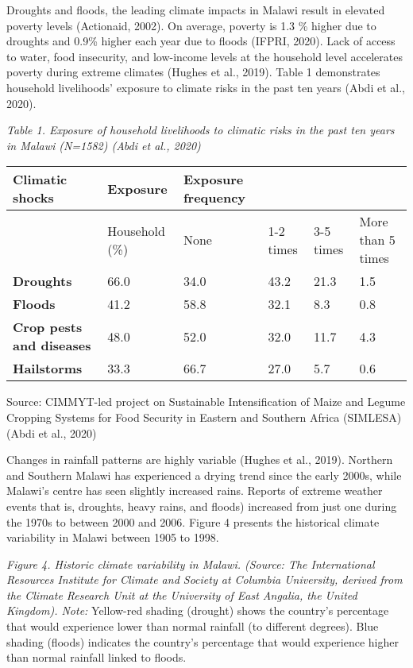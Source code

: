 \documentclass[
]{book}
\begin{document}
Droughts and floods, the leading climate impacts in Malawi result in elevated poverty levels (Actionaid, 2002). On average, poverty is 1.3 \% higher due to
droughts and 0.9\% higher each year due to floods (IFPRI, 2020). Lack of access to water, food insecurity, and low-income levels at the household level
accelerates poverty during extreme climates (Hughes et al., 2019). Table 1 demonstrates household livelihoods' exposure to climate risks in the past ten years
(Abdi et al., 2020).

\emph{Table 1. Exposure of household livelihoods to climatic risks in the past ten years in Malawi (N=1582) (Abdi et al., 2020)}

\begin{longtable}[]{@{}llllll@{}}
\toprule
\textbf{Climatic shocks} & \textbf{Exposure} & \textbf{Exposure frequency} & & & \\
\midrule
\endhead
& Household (\%) & None & 1-2 times & 3-5 times & More than 5 times \\
\textbf{Droughts} & 66.0 & 34.0 & 43.2 & 21.3 & 1.5 \\
\textbf{Floods} & 41.2 & 58.8 & 32.1 & 8.3 & 0.8 \\
\textbf{Crop pests and diseases} & 48.0 & 52.0 & 32.0 & 11.7 & 4.3 \\
\textbf{Hailstorms} & 33.3 & 66.7 & 27.0 & 5.7 & 0.6 \\
\bottomrule
\end{longtable}

Source: CIMMYT-led project on Sustainable Intensification of Maize and Legume Cropping Systems for Food Security in Eastern and Southern Africa (SIMLESA) (Abdi
et al., 2020)

Changes in rainfall patterns are highly variable (Hughes et al., 2019). Northern and Southern Malawi has experienced a drying trend since the early 2000s, while
Malawi's centre has seen slightly increased rains. Reports of extreme weather events that is, droughts, heavy rains, and floods) increased from just one during
the 1970s to between 2000 and 2006. Figure 4 presents the historical climate variability in Malawi between 1905 to 1998.

\emph{Figure 4. Historic climate variability in Malawi. (Source: The International Resources Institute for Climate and Society at Columbia University, derived from the Climate Research Unit at the University of East Angalia, the United Kingdom). Note:} Yellow-red shading (drought) shows the country's percentage that would
experience lower than normal rainfall (to different degrees). Blue shading (floods) indicates the country's percentage that would experience higher than normal
rainfall linked to floods.
\end{document}
